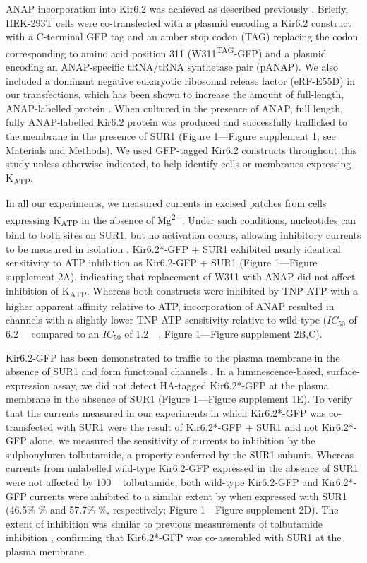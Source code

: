 \documentclass[10pt,lineno, doublespacing]{elife}
\begin{document}
ANAP incorporation into Kir6.2 was achieved as described previously \citep{RN17, RN22, RN80}.
Briefly, HEK-293T cells were co-transfected with a plasmid encoding a Kir6.2 construct with a C-terminal GFP tag and an amber stop codon (TAG) replacing the codon corresponding to amino acid position 311 (W311\textsuperscript{TAG}-GFP) and a plasmid encoding an ANAP-specific tRNA/tRNA synthetase pair (pANAP).
We also included a dominant negative eukaryotic ribosomal release factor (eRF-E55D) in our transfections, which has been shown to increase the amount of full-length, ANAP-labelled protein \citep{RN42, RN80}.
When cultured in the presence of ANAP, full length, fully ANAP-labelled Kir6.2 protein was produced and successfully trafficked to the membrane in the presence of SUR1 (Figure 1—Figure supplement 1; see Materials and Methods).
We used GFP-tagged Kir6.2 constructs throughout this study unless otherwise indicated, to help identify cells or membranes expressing K\textsubscript{ATP}.

In all our experiments, we measured currents in excised patches from cells expressing K\textsubscript{ATP} in the absence of Mg\textsuperscript{2+}.
Under such conditions, nucleotides can bind to both sites on SUR1, but no activation occurs, allowing inhibitory currents to be measured in isolation \citep{RN82, RN60, RN80}.
Kir6.2*-GFP + SUR1 exhibited nearly identical sensitivity to ATP inhibition as Kir6.2-GFP + SUR1 (Figure 1—Figure supplement 2A), indicating that replacement of W311 with ANAP did not affect inhibition of K\textsubscript{ATP}.
Whereas both constructs were inhibited by TNP-ATP with a higher apparent affinity relative to ATP, incorporation of ANAP resulted in channels with a slightly lower TNP-ATP sensitivity relative to wild-type ($IC_{50}$ of \SI{6.2}{\micro\Molar} compared to an $IC_{50}$ of \SI{1.2}{\micro\Molar}, Figure 1—Figure supplement 2B,C).

Kir6.2-GFP has been demonstrated to traffic to the plasma membrane in the absence of SUR1 and form functional channels \citep{RN86, RN48}.
In a luminescence-based, surface-expression assay, we did not detect HA-tagged Kir6.2*-GFP at the plasma membrane in the absence of SUR1 (Figure 1—Figure supplement 1E).
To verify that the currents measured in our experiments in which Kir6.2*-GFP was co-transfected with SUR1 were the result of Kir6.2*-GFP + SUR1 and not Kir6.2*-GFP alone, we measured the sensitivity of currents to inhibition by the sulphonylurea tolbutamide, a property conferred by the SUR1 subunit.
Whereas currents from unlabelled wild-type Kir6.2-GFP expressed in the absence of SUR1 were not affected by 100 \si{\micro\Molar} tolbutamide, both wild-type Kir6.2-GFP and Kir6.2*-GFP currents were inhibited to a similar extent by when expressed with SUR1 (46.5\% \% and 57.7\% \%, respectively; Figure 1—Figure supplement 2D).
The extent of inhibition was similar to previous measurements of tolbutamide inhibition \citep{RN10}, confirming that Kir6.2*-GFP was co-assembled with SUR1 at the plasma membrane.
\end{document}

